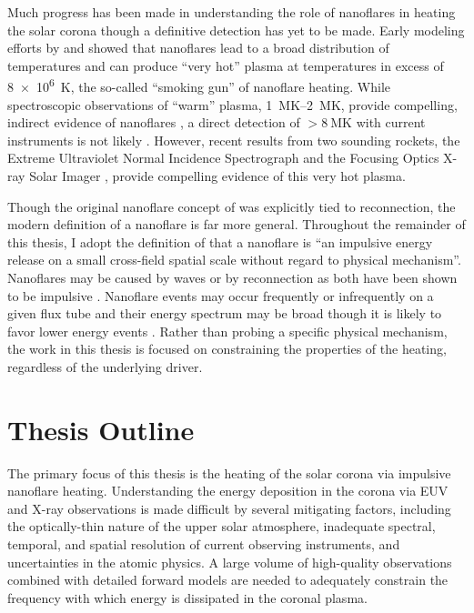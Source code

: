 Much progress has been made in understanding the role of nanoflares in heating the solar corona though a definitive detection has yet to be made. Early modeling efforts by \citet{cargill_implications_1994} and \citet{cargill_nanoflare_2004} showed that nanoflares lead to a broad distribution of temperatures and can produce ``very hot'' plasma at temperatures in excess of \SI{8e6}{\kelvin}, the so-called ``smoking gun'' of nanoflare heating. While spectroscopic observations of ``warm'' plasma, \SIrange{1}{2}{\mega\kelvin}, provide compelling, indirect evidence of nanoflares \citep[e.g.]{warren_constraints_2011,warren_systematic_2012,viall_evidence_2012}, a direct detection of $>\SI{8}{\mega\kelvin}$ with current instruments is not likely \citep{winebarger_defining_2012}. However, recent results from two sounding rockets, the Extreme Ultraviolet Normal Incidence Spectrograph \citep[EUNIS,][]{brosius_pervasive_2014} and the Focusing Optics X-ray Solar Imager \citep[FOXSI,][]{ishikawa_detection_2017}, provide compelling evidence of this very hot plasma.

Though the original nanoflare concept of \citet{parker_nanoflares_1988} was explicitly tied to reconnection, the modern definition of a nanoflare is far more general. Throughout the remainder of this thesis, I adopt the definition of \citet{klimchuk_key_2015} that a nanoflare is ``an impulsive energy release on a small cross-field spatial scale without regard to physical mechanism''. Nanoflares may be caused by waves or by reconnection as both have been shown to be impulsive \citep{klimchuk_solving_2006,klimchuk_key_2015}. Nanoflare events may occur frequently or infrequently on a given flux tube and their energy spectrum may be broad though it is likely to favor lower energy events \citep{hudson_solar_1991}. Rather than probing a specific physical mechanism, the work in this thesis is focused on constraining the properties of the heating, regardless of the underlying driver.

\section{Thesis Outline}\label{sec:outline}

The primary focus of this thesis is the heating of the solar corona via impulsive nanoflare heating. Understanding the energy deposition in the corona via EUV and X-ray observations is made difficult by several mitigating factors, including the optically-thin nature of the upper solar atmosphere, inadequate spectral, temporal, and spatial resolution of current observing instruments, and uncertainties in the atomic physics. A large volume of high-quality observations combined with detailed forward models are needed to adequately constrain the frequency with which energy is dissipated in the coronal plasma.

